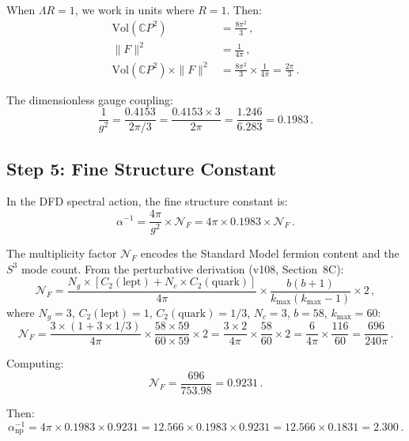 \documentclass[11pt,a4paper]{article}
\newcommand{\CP}{\mathbb{C}P}
\begin{document}
When $\Lambda R = 1$, we work in units where $R = 1$. Then:
\begin{align}
\mathrm{Vol}(\CP^2) &= \frac{8\pi^2}{3}\,, \\
\|F\|^2 &= \frac{1}{4\pi}\,, \\
\mathrm{Vol}(\CP^2) \times \|F\|^2 &= \frac{8\pi^2}{3} \times \frac{1}{4\pi} = \frac{2\pi}{3}\,.
\end{align}

The dimensionless gauge coupling:
\begin{equation}
\frac{1}{g^2} = \frac{0.4153}{2\pi/3} = \frac{0.4153 \times 3}{2\pi} = \frac{1.246}{6.283} = 0.1983\,.
\end{equation}

\subsection{Step 5: Fine Structure Constant}

In the DFD spectral action, the fine structure constant is:
\begin{equation}
\alpha^{-1} = \frac{4\pi}{g^2} \times \mathcal{N}_F = 4\pi \times 0.1983 \times \mathcal{N}_F\,.
\end{equation}

The multiplicity factor $\mathcal{N}_F$ encodes the Standard Model fermion content and the $S^3$ mode count. From the perturbative derivation (v108, Section~8C):
\begin{equation}
\mathcal{N}_F = \frac{N_g \times [C_2(\mathrm{lept}) + N_c \times C_2(\mathrm{quark})]}{4\pi} \times \frac{b(b+1)}{k_{\max}(k_{\max}-1)} \times 2\,,
\end{equation}
where $N_g = 3$, $C_2(\mathrm{lept}) = 1$, $C_2(\mathrm{quark}) = 1/3$, $N_c = 3$, $b = 58$, $k_{\max} = 60$:
\begin{equation}
\mathcal{N}_F = \frac{3 \times (1 + 3 \times 1/3)}{4\pi} \times \frac{58 \times 59}{60 \times 59} \times 2 = \frac{3 \times 2}{4\pi} \times \frac{58}{60} \times 2 = \frac{6}{4\pi} \times \frac{116}{60} = \frac{696}{240\pi}\,.
\end{equation}

Computing:
\begin{equation}
\mathcal{N}_F = \frac{696}{753.98} = 0.9231\,.
\end{equation}

Then:
\begin{equation}
\alpha^{-1}_{\mathrm{np}} = 4\pi \times 0.1983 \times 0.9231 = 12.566 \times 0.1983 \times 0.9231 = 12.566 \times 0.1831 = 2.300\,.
\end{equation}
\end{document}
